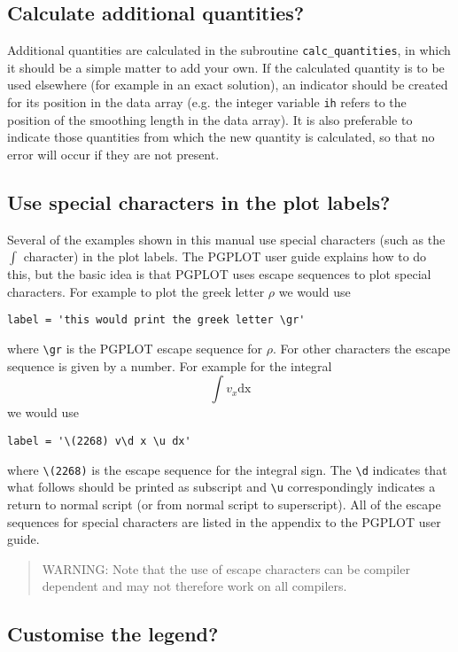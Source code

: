 \documentclass[a4paper,12pt]{article}
\begin{document}
\subsection{Calculate additional quantities?}
 Additional quantities are calculated in the subroutine \verb+calc_quantities+,
in which it should be a simple matter to add your own.
If the calculated quantity is to be used elsewhere (for example in an exact
solution), an indicator should be created for its position in the data array
(e.g. the integer variable \verb+ih+ refers to the position of the smoothing
length in the data array). It is also preferable to indicate those quantities
from which the new quantity is calculated, so that no error will occur if they
are not present.

\subsection{Use special characters in the plot labels?}
 Several of the examples shown in this manual use special characters (such as
the $\int$ character) in the plot labels. The PGPLOT user guide explains how to do
this, but the basic idea is that PGPLOT uses escape sequences to plot special
characters. For example to plot the greek letter $\rho$ we would use
\begin{verbatim}
label = 'this would print the greek letter \gr'
\end{verbatim}
where \verb+\gr+ is the PGPLOT escape sequence for $\rho$. For other
characters the escape sequence is given by a number. For example for the integral 
\begin{equation}
\int v_x \mathrm{dx}
\end{equation}
we would use
\begin{verbatim}
label = '\(2268) v\d x \u dx'
\end{verbatim}
where \verb+\(2268)+ is the escape sequence for the integral sign. The
\verb+\d+ indicates that what follows should be printed as subscript and
\verb+\u+ correspondingly indicates a return to normal script (or from normal script to
superscript). All of the escape sequences for special characters are listed in
the appendix to the PGPLOT user guide.
\begin{quote}
 WARNING: Note that the use of escape characters can be compiler dependent and
 may not therefore work on all compilers.
\end{quote}

\subsection{Customise the legend?}
\end{document}
